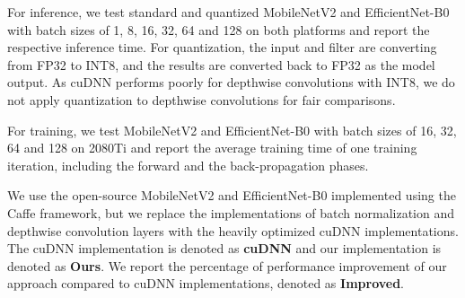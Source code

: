  For inference, we test standard and quantized MobileNetV2 and EfficientNet-B0 with batch sizes of 1, 8, 16, 32, 64 and 128 on both
platforms and report the respective inference time. For quantization, the input and filter are converting from FP32 to INT8, and the
results are converted back to FP32 as the model output. As cuDNN performs poorly for depthwise convolutions with INT8, we do not apply
quantization to depthwise convolutions for fair comparisons.

 For training, we test MobileNetV2 and EfficientNet-B0 with batch sizes of 16, 32, 64 and 128 on 2080Ti and report the average training time
of one training iteration, including the forward and the back-propagation phases.

 We use the open-source MobileNetV2 and EfficientNet-B0 implemented using the Caffe framework, but we replace the
implementations of batch normalization and depthwise convolution layers with the heavily optimized cuDNN implementations. The cuDNN
implementation is denoted as \textbf{cuDNN} and our implementation is denoted as \textbf{Ours}. We report the percentage of performance
improvement of our approach compared to cuDNN implementations, denoted as \textbf{Improved}.


